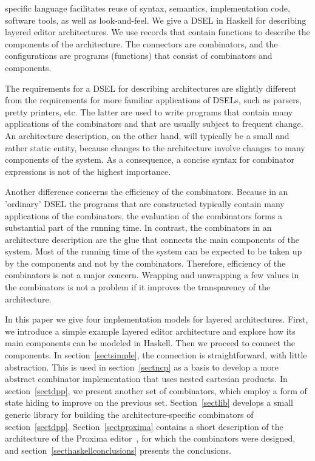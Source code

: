       specific language facilitates reuse of syntax, semantics, implementation code,
      software tools, as well as look-and-feel. We give a DSEL in Haskell for
      describing layered editor architectures. We use records that contain functions
      to describe the components of the architecture. The connectors are combinators,
      and the configurations are programs (functions) that consist of combinators and
      components. 
\par The requirements for a DSEL for describing architectures are slightly
      different from the requirements for more familiar applications of DSELs, such
      as parsers, pretty printers, etc. The latter are used to write programs that
      contain many applications of the combinators and that are usually subject to
      frequent change. An architecture description, on the other hand, will typically
      be a small and rather static entity, because changes to the architecture
      involve changes to many components of the system. As a consequence, a concise
      syntax for combinator expressions is not of the highest importance.
\par Another difference concerns the efficiency of the combinators. Because
      in an 'ordinary' DSEL the programs that are constructed typically contain many
      applications of the combinators, the evaluation of the combinators forms a
      substantial part of the running time. In contrast, the combinators in an
      architecture description are the glue that connects the main components of the
      system. Most of the running time of the system can be expected to be taken up
      by the components and not by the combinators. Therefore, efficiency of the
      combinators is not a major concern. Wrapping and unwrapping a few values in the
      combinators is not a problem if it improves the transparency of the
      architecture.
\par  In this paper we give four implementation models for layered
      architectures. First, we introduce a simple example layered editor architecture
      and explore how its main components can be modeled in Haskell. Then we proceed
      to connect the components. In section~\ref{sectsimple}, the connection is
      straightforward, with little abstraction. This is used in section~\ref{sectncp}
      as a basis to develop a more abstract combinator implementation that uses
      nested cartesian products. In section~\ref{sectdpp}, we present another set of
      combinators, which employ a form of state hiding to improve on the previous
      set. Section~\ref{sectlib} develops a small generic library for building the
      architecture-specific combinators of section~\ref{sectdpp}.
      Section~\ref{sectproxima} contains a short description of the architecture of
      the Proxima editor~\cite{proxima}, for which the combinators were
      designed, and section~\ref{secthaskellconclusions} presents the
      conclusions.
